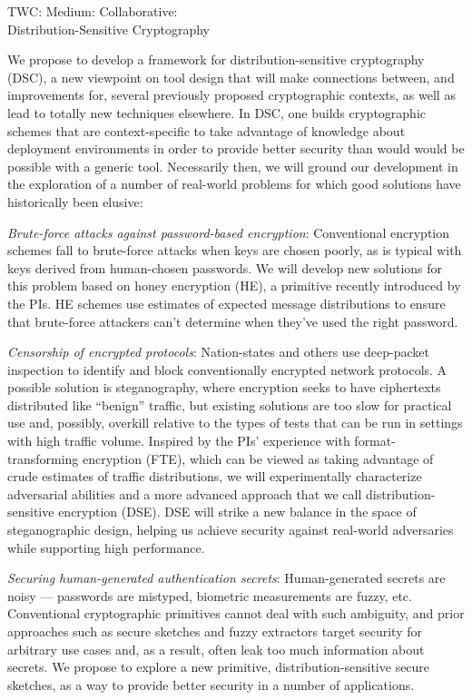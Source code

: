 \begin{center}
{\Large TWC: Medium: Collaborative: }\\ 
{\Large Distribution-Sensitive Cryptography} 
\end{center}
\noindent
\thispagestyle{empty}

We propose to develop a framework for distribution-sensitive cryptography
(DSC), a new viewpoint on tool design that will make connections between, and
improvements for, several previously proposed cryptographic contexts, as well as
lead to totally new techniques elsewhere. In DSC, one builds cryptographic
schemes that are context-specific to take advantage of knowledge about 
deployment environments in order to provide better security than would would be
possible with a generic tool.  Necessarily then, we will ground our development
in the exploration of a number of real-world problems for which good solutions
have historically been elusive:
\begin{newitemize}
\item \emph{Brute-force attacks against password-based encryption}: Conventional
encryption schemes fall to brute-force attacks when keys are chosen poorly, as
is typical with keys derived from human-chosen passwords. We will
develop new solutions for this problem based on
honey encryption (HE), a primitive recently introduced by the PIs. HE schemes
use estimates of expected message distributions to ensure that
brute-force attackers can't determine when they've used the right password.
%
\item \emph{Censorship of encrypted protocols}: Nation-states and others use
deep-packet inspection to identify and block conventionally encrypted
network protocols. A possible solution is steganography, where encryption seeks to have
ciphertexts distributed like ``benign'' traffic, but existing solutions are
too slow for practical use and, possibly, overkill relative to the types of
tests that can be run in settings with high traffic volume. Inspired by the
PIs' experience with format-transforming encryption (FTE), which can be viewed as
taking advantage of crude estimates of traffic distributions, 
we will experimentally characterize
adversarial abilities and a more advanced approach that we call
distribution-sensitive encryption (DSE).  DSE will strike a new
balance in the space of steganographic design, helping us achieve
security against real-world adversaries while supporting high performance. 
%
\item \emph{Securing human-generated authentication secrets}: Human-generated
secrets are noisy --- passwords are mistyped, biometric measurements are fuzzy,
etc. Conventional cryptographic primitives cannot deal with such ambiguity, and prior approaches
such as secure sketches and fuzzy extractors target security for arbitrary use
cases and, as a result, often leak too much information about secrets. 
We propose to explore a new primitive, distribution-sensitive secure sketches, 
as a way to provide better security in a number of applications.
\end{newitemize}
